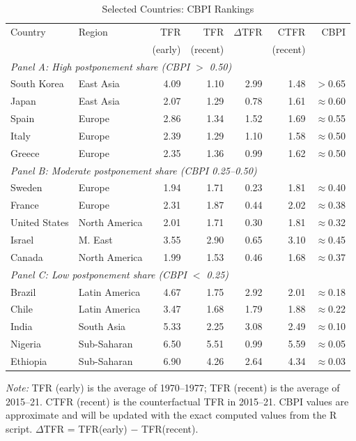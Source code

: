 \documentclass[12pt]{article}
\begin{document}
\begin{table}[H]
\centering
\caption{Selected Countries: CBPI Rankings}
\label{tab:rankings}
\begin{threeparttable}
\small
\begin{tabular}{llrrrrr}
\toprule
Country & Region & TFR & TFR & $\Delta$TFR & CTFR & CBPI \\
        &        & (early) & (recent) & & (recent) & \\
\midrule
\multicolumn{7}{l}{\textit{Panel A: High postponement share (CBPI $>$ 0.50)}} \\[2pt]
South Korea    & East Asia    & 4.09 & 1.10 & 2.99 & 1.48 & $>$0.65 \\
Japan          & East Asia    & 2.07 & 1.29 & 0.78 & 1.61 & $\approx$0.60 \\
Spain          & Europe       & 2.86 & 1.34 & 1.52 & 1.69 & $\approx$0.55 \\
Italy          & Europe       & 2.39 & 1.29 & 1.10 & 1.58 & $\approx$0.50 \\
Greece         & Europe       & 2.35 & 1.36 & 0.99 & 1.62 & $\approx$0.50 \\
\midrule
\multicolumn{7}{l}{\textit{Panel B: Moderate postponement share (CBPI 0.25--0.50)}} \\[2pt]
Sweden         & Europe       & 1.94 & 1.71 & 0.23 & 1.81 & $\approx$0.40 \\
France         & Europe       & 2.31 & 1.87 & 0.44 & 2.02 & $\approx$0.38 \\
United States  & North America& 2.01 & 1.71 & 0.30 & 1.81 & $\approx$0.32 \\
Israel         & M. East      & 3.55 & 2.90 & 0.65 & 3.10 & $\approx$0.45 \\
Canada         & North America& 1.99 & 1.53 & 0.46 & 1.68 & $\approx$0.37 \\
\midrule
\multicolumn{7}{l}{\textit{Panel C: Low postponement share (CBPI $<$ 0.25)}} \\[2pt]
Brazil         & Latin America& 4.67 & 1.75 & 2.92 & 2.01 & $\approx$0.18 \\
Chile          & Latin America& 3.47 & 1.68 & 1.79 & 1.88 & $\approx$0.22 \\
India          & South Asia   & 5.33 & 2.25 & 3.08 & 2.49 & $\approx$0.10 \\
Nigeria        & Sub-Saharan  & 6.50 & 5.51 & 0.99 & 5.59 & $\approx$0.05 \\
Ethiopia       & Sub-Saharan  & 6.90 & 4.26 & 2.64 & 4.34 & $\approx$0.03 \\
\bottomrule
\end{tabular}
\begin{tablenotes}
\footnotesize
\emph{Note:} TFR (early) is the average of 1970--1977; TFR (recent) is the
average of 2015--21. CTFR (recent) is the counterfactual TFR in 2015--21.
CBPI values are approximate and will be updated with the exact computed values
from the R script. $\Delta$TFR = TFR(early) $-$ TFR(recent).
\end{tablenotes}
\end{threeparttable}
\end{table}
\end{document}
